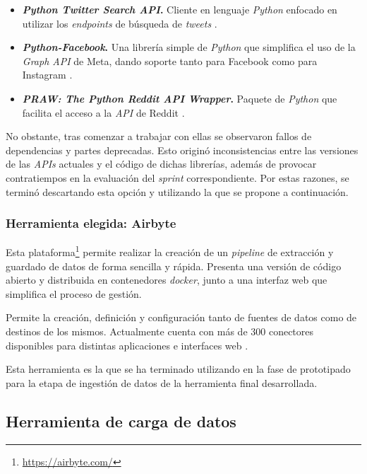 \begin{itemize}
    \item \textbf{\textit{Python Twitter Search API}.} Cliente en lenguaje \textit{Python} enfocado en utilizar los \textit{endpoints} de búsqueda de \textit{tweets} \cite{twitterSearchAPI}.
    \item \textbf{\textit{Python-Facebook}.} Una librería simple de \textit{Python} que simplifica el uso de la \textit{Graph API} de Meta, dando soporte tanto para Facebook como para Instagram \cite{facebookAPIsearch}.
    \item \textbf{\textit{PRAW: The Python Reddit API Wrapper}.} Paquete de \textit{Python} que facilita el acceso a la \textit{API} de Reddit \cite{redditPRAW}.
\end{itemize}

No obstante, tras comenzar a trabajar con ellas se observaron fallos de dependencias y partes deprecadas. Esto originó inconsistencias entre las versiones de las \textit{APIs} actuales y el código de dichas librerías, además de provocar contratiempos en la evaluación del \textit{sprint} correspondiente. Por estas razones, se terminó descartando esta opción y utilizando la que se propone a continuación. 

\subsubsection{Herramienta elegida: Airbyte}

Esta plataforma\footnote{\url{https://airbyte.com/}} permite realizar la creación de un \textit{pipeline} de extracción y guardado de datos de forma sencilla y rápida. Presenta una versión de código abierto y distribuida en contenedores \textit{docker}, junto a una interfaz web que simplifica el proceso de gestión.

Permite la creación, definición y configuración tanto de fuentes de datos como de destinos de los mismos. Actualmente cuenta con más de 300 conectores disponibles para distintas aplicaciones e interfaces web \cite{airbyteConnectors}.

Esta herramienta es la que se ha terminado utilizando en la fase de prototipado para la etapa de ingestión de datos de la herramienta final desarrollada.

\subsection{Herramienta de carga de datos}

